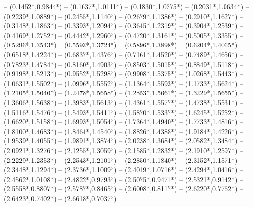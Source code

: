 {	-- ({0.1452*\dx},{0.9844*\dy})
	-- ({0.1637*\dx},{1.0111*\dy})
	-- ({0.1830*\dx},{1.0375*\dy})
	-- ({0.2031*\dx},{1.0634*\dy})
	-- ({0.2239*\dx},{1.0889*\dy})
	-- ({0.2455*\dx},{1.1140*\dy})
	-- ({0.2679*\dx},{1.1386*\dy})
	-- ({0.2910*\dx},{1.1627*\dy})
	-- ({0.3148*\dx},{1.1863*\dy})
	-- ({0.3393*\dx},{1.2094*\dy})
	-- ({0.3645*\dx},{1.2319*\dy})
	-- ({0.3904*\dx},{1.2539*\dy})
	-- ({0.4169*\dx},{1.2752*\dy})
	-- ({0.4442*\dx},{1.2960*\dy})
	-- ({0.4720*\dx},{1.3161*\dy})
	-- ({0.5005*\dx},{1.3355*\dy})
	-- ({0.5296*\dx},{1.3543*\dy})
	-- ({0.5593*\dx},{1.3724*\dy})
	-- ({0.5896*\dx},{1.3898*\dy})
	-- ({0.6204*\dx},{1.4065*\dy})
	-- ({0.6518*\dx},{1.4224*\dy})
	-- ({0.6837*\dx},{1.4376*\dy})
	-- ({0.7161*\dx},{1.4520*\dy})
	-- ({0.7489*\dx},{1.4656*\dy})
	-- ({0.7823*\dx},{1.4784*\dy})
	-- ({0.8160*\dx},{1.4903*\dy})
	-- ({0.8503*\dx},{1.5015*\dy})
	-- ({0.8849*\dx},{1.5118*\dy})
	-- ({0.9198*\dx},{1.5213*\dy})
	-- ({0.9552*\dx},{1.5298*\dy})
	-- ({0.9908*\dx},{1.5375*\dy})
	-- ({1.0268*\dx},{1.5443*\dy})
	-- ({1.0631*\dx},{1.5502*\dy})
	-- ({1.0996*\dx},{1.5552*\dy})
	-- ({1.1364*\dx},{1.5593*\dy})
	-- ({1.1733*\dx},{1.5624*\dy})
	-- ({1.2105*\dx},{1.5646*\dy})
	-- ({1.2478*\dx},{1.5658*\dy})
	-- ({1.2853*\dx},{1.5661*\dy})
	-- ({1.3229*\dx},{1.5655*\dy})
	-- ({1.3606*\dx},{1.5638*\dy})
	-- ({1.3983*\dx},{1.5613*\dy})
	-- ({1.4361*\dx},{1.5577*\dy})
	-- ({1.4738*\dx},{1.5531*\dy})
	-- ({1.5116*\dx},{1.5476*\dy})
	-- ({1.5493*\dx},{1.5411*\dy})
	-- ({1.5870*\dx},{1.5337*\dy})
	-- ({1.6245*\dx},{1.5252*\dy})
	-- ({1.6620*\dx},{1.5158*\dy})
	-- ({1.6993*\dx},{1.5054*\dy})
	-- ({1.7364*\dx},{1.4940*\dy})
	-- ({1.7733*\dx},{1.4816*\dy})
	-- ({1.8100*\dx},{1.4683*\dy})
	-- ({1.8464*\dx},{1.4540*\dy})
	-- ({1.8826*\dx},{1.4388*\dy})
	-- ({1.9184*\dx},{1.4226*\dy})
	-- ({1.9539*\dx},{1.4055*\dy})
	-- ({1.9891*\dx},{1.3874*\dy})
	-- ({2.0238*\dx},{1.3684*\dy})
	-- ({2.0582*\dx},{1.3484*\dy})
	-- ({2.0921*\dx},{1.3276*\dy})
	-- ({2.1255*\dx},{1.3059*\dy})
	-- ({2.1585*\dx},{1.2832*\dy})
	-- ({2.1910*\dx},{1.2597*\dy})
	-- ({2.2229*\dx},{1.2353*\dy})
	-- ({2.2543*\dx},{1.2101*\dy})
	-- ({2.2850*\dx},{1.1840*\dy})
	-- ({2.3152*\dx},{1.1571*\dy})
	-- ({2.3448*\dx},{1.1294*\dy})
	-- ({2.3736*\dx},{1.1009*\dy})
	-- ({2.4019*\dx},{1.0716*\dy})
	-- ({2.4294*\dx},{1.0416*\dy})
	-- ({2.4562*\dx},{1.0108*\dy})
	-- ({2.4822*\dx},{0.9793*\dy})
	-- ({2.5075*\dx},{0.9471*\dy})
	-- ({2.5321*\dx},{0.9142*\dy})
	-- ({2.5558*\dx},{0.8807*\dy})
	-- ({2.5787*\dx},{0.8465*\dy})
	-- ({2.6008*\dx},{0.8117*\dy})
	-- ({2.6220*\dx},{0.7762*\dy})
	-- ({2.6423*\dx},{0.7402*\dy})
	-- ({2.6618*\dx},{0.7037*\dy})
}
